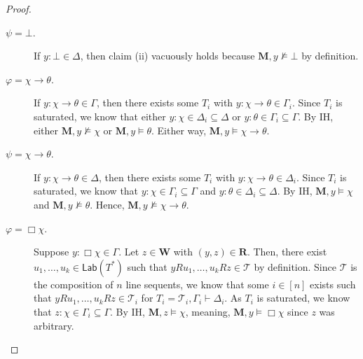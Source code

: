 \documentclass[10pt,a4paper]{amsart}
\newcommand{\M}{\mathbf{M}}
\newcommand{\R}{\mathbf{R}}
\newcommand{\W}{\mathbf{W}}
\newcommand{\imp}{\rightarrow}
\newcommand{\lab}{\mathsf{Lab}}
\renewcommand{\phi}{\varphi}
\newcommand{\sar}{\vdash}
\newcommand{\tel}{\mathcal{T}}
\newcommand{\tseq}{T} %
\begin{document}
\begin{proof}
\begin{description}
\item[$\psi = \bot.$] If $y : \bot \in \Delta$, then claim (ii) vacuously holds because $\M, y \not\models \bot$ by definition.

\item[$\phi = \chi \imp \theta.$] If $y : \chi \imp \theta \in \Gamma$, then there exists some $\tseq_{i}$ with $y : \chi \imp \theta \in \Gamma_{i}$. Since $\tseq_{i}$ is saturated, we know that either $y : \chi \in \Delta_{i} \subseteq \Delta$ or $y : \theta \in \Gamma_{i} \subseteq \Gamma$. By IH, either $\M,y \not\models \chi$ or $\M, y \models \theta$. Either way, $\M, y \models \chi \imp \theta$.

\item[$\psi = \chi \imp \theta.$] If $y : \chi \imp \theta \in \Delta$, then there exists some $\tseq_{i}$ with $y : \chi \imp \theta \in \Delta_{i}$. Since $\tseq_{i}$ is saturated, we know that $y : \chi \in \Gamma_{i} \subseteq \Gamma$ and $y : \theta \in \Delta_{i} \subseteq \Delta$. By IH, $\M,y \models \chi$ and $\M, y \not\models \theta$. Hence, $\M, y \not\models \chi \imp \theta$.

\item[$\phi = \Box \chi.$] Suppose $y : \Box \chi \in \Gamma$. Let $z \in \W$ with $(y,z) \in \R$. Then, there exist $u_{1}, \ldots, u_{k} \in \lab(\tseq^{*})$ such that $yRu_{1}, \ldots, u_{k}Rz \in \tel$ by definition. Since $\tel$ is the composition of $n$ line sequents, we know that some $i \in [n]$ exists such that $yRu_{1}, \ldots, u_{k}Rz \in \tel_{i}$ for $\tseq_{i} = \tel_{i}, \Gamma_{i} \sar \Delta_{i}$. As $\tseq_{i}$ is saturated, we know that $z : \chi \in \Gamma_{i} \subseteq \Gamma$. By IH, $\M, z \models \chi$, meaning, $\M, y \models \Box \chi$ since $z$ was arbitrary.


\end{description}
\end{proof}
\end{document}
